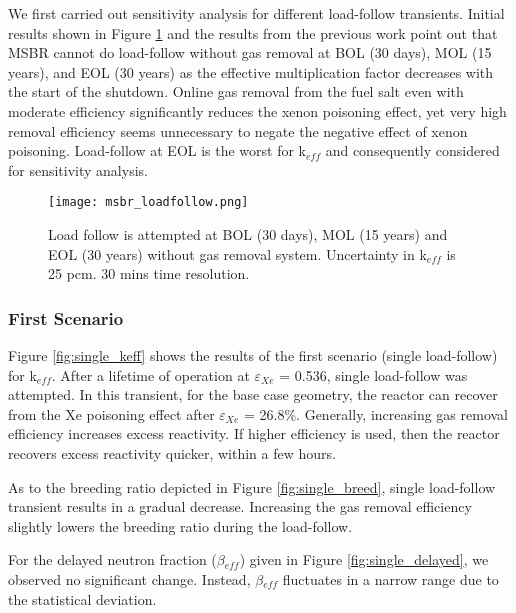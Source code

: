     We first carried out sensitivity analysis for different load-follow transients. Initial results shown in Figure \ref{fig:loadfollow} and the results from the previous work \cite{rykhlevskii_fuel_2020} point out that MSBR cannot do load-follow without gas removal at BOL (30 days), MOL (15 years), and EOL (30 years) as the effective multiplication factor decreases with the start of the shutdown. Online gas removal from the fuel salt even with moderate efficiency significantly reduces the xenon poisoning effect, yet very high removal efficiency seems unnecessary to negate the negative effect of xenon poisoning. Load-follow at EOL is the worst for k$_{eff}$ and consequently considered for sensitivity analysis.

    \begin{figure}[h]
        \begin{center}
            \texttt{[image: msbr\_loadfollow.png]}
        \end{center}
        \caption{Load follow is attempted at BOL (30 days), MOL (15 years) and EOL (30 years) without gas removal system. Uncertainty in k$_{eff}$ is 25 pcm. 30 mins time resolution.}
        \label{fig:loadfollow}
    \end{figure}

\subsubsection{First Scenario}

    Figure \ref{fig:single_keff} shows the results of the first scenario (single load-follow) for k$_{eff}$. After a lifetime of operation at $\varepsilon$$_{Xe}$ = 0.536, single load-follow was attempted. In this transient, for the base case geometry, the reactor can recover from the Xe poisoning effect after $\varepsilon$$_{Xe}$ = 26.8\%. Generally, increasing gas removal efficiency increases excess reactivity. If higher efficiency is used, then the reactor recovers excess reactivity quicker, within a few hours.

    As to the breeding ratio depicted in Figure \ref{fig:single_breed}, single load-follow transient results in a gradual decrease. Increasing the gas removal efficiency slightly lowers the breeding ratio during the load-follow.

    For the delayed neutron fraction ($\beta$$_{eff}$) given in Figure \ref{fig:single_delayed}, we observed no significant change. Instead, $\beta$$_{eff}$ fluctuates in a narrow range due to the statistical deviation.

